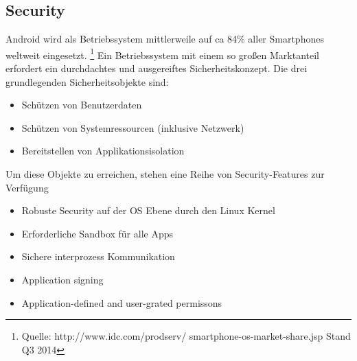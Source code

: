 \subsection{Security}
Android wird als Betriebssystem mittlerweile auf ca 84\% aller Smartphones weltweit eingesetzt. \footnote{Quelle: http://www.idc.com/prodserv/									smartphone-os-market-share.jsp Stand Q3 2014} Ein Betriebssystem mit einem so großen Marktanteil erfordert ein durchdachtes und ausgereiftes Sicherheitskonzept.
Die drei grundlegenden Sicherheitsobjekte sind:
\begin{itemize}
	\item Schützen von Benutzerdaten
	\item Schützen von Systemressourcen (inklusive Netzwerk)
	\item Bereitstellen von Applikationsisolation
\end{itemize}
Um diese Objekte zu erreichen, stehen eine Reihe von Security-Features zur Verfügung
\begin{itemize}
	\item Robuste Security auf der OS Ebene durch den Linux Kernel
	\item Erforderliche Sandbox für alle Apps
	\item Sichere interprozess Kommunikation
	\item Application signing
	\item Application-defined and user-grated permissons
\end{itemize}

